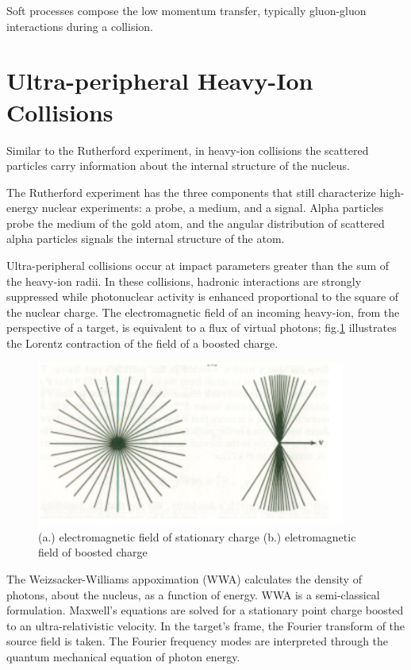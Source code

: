Soft processes compose the low momentum transfer, typically gluon-gluon interactions during a  collision.

\section{Ultra-peripheral Heavy-Ion Collisions}

Similar to the Rutherford experiment, in heavy-ion collisions the scattered particles carry information about the internal structure of the nucleus. 

The Rutherford experiment has the three components that still characterize high-energy nuclear experiments: a probe, a medium, and a signal. Alpha particles probe the medium of the gold atom, and the angular distribution of scattered alpha particles signals the internal structure of the atom. 

Ultra-peripheral collisions occur at impact parameters greater than the sum of the heavy-ion radii. In these collisions, hadronic interactions are strongly suppressed while photonuclear activity is enhanced proportional to the square of the nuclear charge. The electromagnetic field of an incoming heavy-ion, from the perspective of a target, is equivalent to a flux of virtual photons; fig.\ref{fig:smushedField} illustrates the Lorentz contraction of the field of a boosted charge.

\begin{figure}[h!]
\begin{centering}
\includegraphics[width=4in]{Chapter1/importfigs/jackson_em_wwa.png}
\par\end{centering}
\caption{ (a.) electromagnetic field of stationary charge (b.) eletromagnetic field of boosted charge \label{fig:smushedField}}
\end{figure}

The Weizsacker-Williams appoximation (WWA) calculates the density of photons, about the nucleus, as a function of energy. WWA is a semi-classical formulation. Maxwell's equations are solved for a stationary point charge boosted to an ultra-relativistic velocity. In the target's frame, the Fourier transform of the source field is taken. The Fourier frequency modes are interpreted through the quantum mechanical equation of photon energy. 

